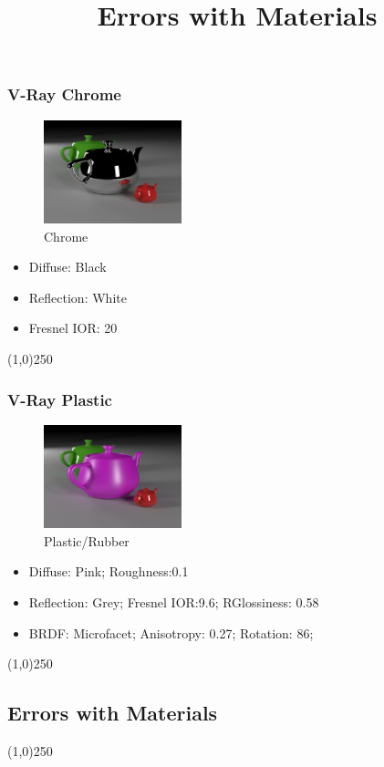 \begin{frame}
\frametitle{V-Ray Chrome}
\begin{figure}
	\centering
	\includegraphics[height=3cm]{./Materials/Chrome}
	\caption{Chrome}
	\label{fig:Chrome}
\end{figure}
\begin{itemize}
	\item Diffuse: Black
	\item Reflection: White
	\item Fresnel IOR: 20 
\end{itemize}
\end{frame}
\begin{center}\line(1,0){250}\end{center}



\begin{frame}
\frametitle{V-Ray Plastic}
\begin{figure}
	\centering
	\includegraphics[height=3cm]{./Materials/Plastic}
	\caption{Plastic/Rubber}
	\label{fig:Plastic/Rubber}
\end{figure}
\begin{itemize}
	\item Diffuse: Pink; Roughness:0.1
	\item Reflection: Grey; Fresnel IOR:9.6; RGlossiness: 0.58
	\item BRDF: Microfacet; Anisotropy: 0.27; Rotation: 86; 
\end{itemize}
\end{frame}
\begin{center}\line(1,0){250}\end{center}



\subsection{Errors with Materials}
\begin{frame}
\title[Errors with Materials]{Errors with Materials}
\titlepage
\end{frame}\begin{center}\line(1,0){250}\end{center}


